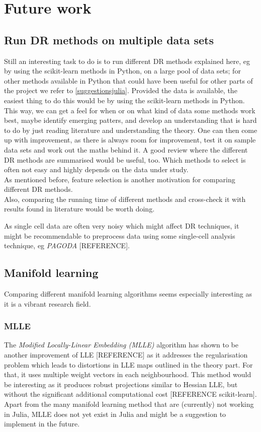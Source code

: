 \documentclass[journal, a4paper]{IEEEtran}
\begin{document}
\section{Future work}

\subsection{Run DR methods on multiple data sets}

Still an interesting task to do is to run different DR methods explained here, eg by using the scikit-learn methods in Python, on a large pool of data sets; for other methods available in Python that could have been useful for other parts of the project we refer to \ref{suggestionsjulia}. Provided the data is available, the easiest thing to do this would be by using the scikit-learn methods in Python. This way, we can get a feel for when or on what kind of data some methods work best, maybe identify emerging patters, and develop an understanding that is hard to do by just reading literature and understanding the theory. One can then come up with improvement, as there is always room for improvement, test it on sample data sets and work out the maths behind it. A good review where the different DR methods are summarised would be useful, too. Which methods to select is often not easy and highly depends on the data under study.\\
As mentioned before, feature selection is another motivation for comparing different DR methods.\\
Also, comparing the running time of different methods and cross-check it with results found in literature would be worth doing.

As single cell data are often very noisy which might affect DR techniques, it might be recommendable to preprocess data using some single-cell analysis technique, eg \textit{PAGODA} [REFERENCE].



\subsection{Manifold learning}
Comparing different manifold learning algorithms seems especially interesting as it is a vibrant research field.\\

\subsubsection{MLLE}
The \textit{Modified Locally-Linear Embedding (MLLE)} algorithm has shown to be another improvement of LLE [REFERENCE] as it addresses the regularisation problem which leads to distortions in LLE maps outlined in the theory part. For that, it uses multiple weight vectors in each neighbourhood. This method would be interesting as it produces robust projections similar to Hessian LLE, but without the significant additional computational cost [REFERENCE scikit-learn].
Apart from the many manifold learning method that are (currently) not working in Julia, MLLE does not yet exist in Julia and might be a suggestion to implement in the future.\\
\end{document}
